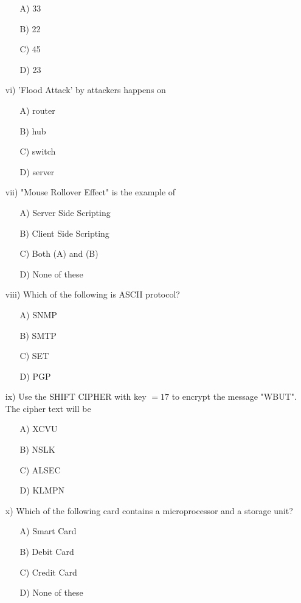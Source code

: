 \begin{enumerate}
    \begin{enumerate}
        \item[A)] 33
        \item[B)] 22
        \item[C)] 45
        \item[D)] 23
    \end{enumerate}
    \item[vi)] 'Flood Attack' by attackers happens on
    \begin{enumerate}
        \item[A)] router
        \item[B)] hub
        \item[C)] switch
        \item[D)] server
    \end{enumerate}
    \item[vii)] "Mouse Rollover Effect" is the example of
    \begin{enumerate}
        \item[A)] Server Side Scripting
        \item[B)] Client Side Scripting
        \item[C)] Both (A) and (B)
        \item[D)] None of these
    \end{enumerate}
    \item[viii)] Which of the following is ASCII protocol?
    \begin{enumerate}
        \item[A)] SNMP
        \item[B)] SMTP
        \item[C)] SET
        \item[D)] PGP
    \end{enumerate}
    \item[ix)] Use the SHIFT CIPHER with key $=17$ to encrypt the message "WBUT". The cipher text will be
    \begin{enumerate}
        \item[A)] XCVU
        \item[B)] NSLK
        \item[C)] ALSEC
        \item[D)] KLMPN
    \end{enumerate}
    \item[x)] Which of the following card contains a microprocessor and a storage unit?
    \begin{enumerate}
        \item[A)] Smart Card
        \item[B)] Debit Card
        \item[C)] Credit Card
        \item[D)] None of these
    \end{enumerate}
\end{enumerate}

